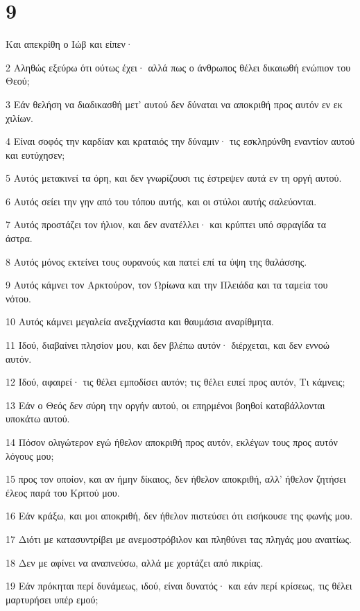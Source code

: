 \chapter{9}

\par Και απεκρίθη ο Ιώβ και είπεν·
\par 2 Αληθώς εξεύρω ότι ούτως έχει· αλλά πως ο άνθρωπος θέλει δικαιωθή ενώπιον του Θεού;
\par 3 Εάν θελήση να διαδικασθή μετ' αυτού δεν δύναται να αποκριθή προς αυτόν εν εκ χιλίων.
\par 4 Είναι σοφός την καρδίαν και κραταιός την δύναμιν· τις εσκληρύνθη εναντίον αυτού και ευτύχησεν;
\par 5 Αυτός μετακινεί τα όρη, και δεν γνωρίζουσι τις έστρεψεν αυτά εν τη οργή αυτού.
\par 6 Αυτός σείει την γην από του τόπου αυτής, και οι στύλοι αυτής σαλεύονται.
\par 7 Αυτός προστάζει τον ήλιον, και δεν ανατέλλει· και κρύπτει υπό σφραγίδα τα άστρα.
\par 8 Αυτός μόνος εκτείνει τους ουρανούς και πατεί επί τα ύψη της θαλάσσης.
\par 9 Αυτός κάμνει τον Αρκτούρον, τον Ωρίωνα και την Πλειάδα και τα ταμεία του νότου.
\par 10 Αυτός κάμνει μεγαλεία ανεξιχνίαστα και θαυμάσια αναρίθμητα.
\par 11 Ιδού, διαβαίνει πλησίον μου, και δεν βλέπω αυτόν· διέρχεται, και δεν εννοώ αυτόν.
\par 12 Ιδού, αφαιρεί· τις θέλει εμποδίσει αυτόν; τις θέλει ειπεί προς αυτόν, Τι κάμνεις;
\par 13 Εάν ο Θεός δεν σύρη την οργήν αυτού, οι επηρμένοι βοηθοί καταβάλλονται υποκάτω αυτού.
\par 14 Πόσον ολιγώτερον εγώ ήθελον αποκριθή προς αυτόν, εκλέγων τους προς αυτόν λόγους μου;
\par 15 προς τον οποίον, και αν ήμην δίκαιος, δεν ήθελον αποκριθή, αλλ' ήθελον ζητήσει έλεος παρά του Κριτού μου.
\par 16 Εάν κράξω, και μοι αποκριθή, δεν ήθελον πιστεύσει ότι εισήκουσε της φωνής μου.
\par 17 Διότι με κατασυντρίβει με ανεμοστρόβιλον και πληθύνει τας πληγάς μου αναιτίως.
\par 18 Δεν με αφίνει να αναπνεύσω, αλλά με χορτάζει από πικρίας.
\par 19 Εάν πρόκηται περί δυνάμεως, ιδού, είναι δυνατός· και εάν περί κρίσεως, τις θέλει μαρτυρήσει υπέρ εμού;
